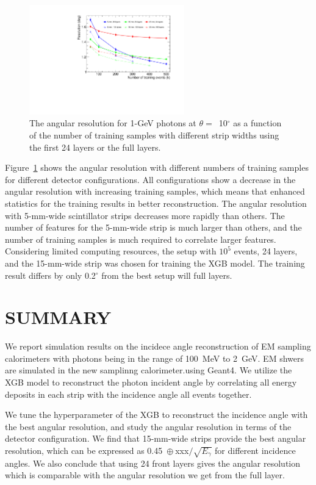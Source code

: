 \documentclass[preprint,12pt,times,a4paper]{elsarticle}
\begin{document}
\begin{figure}[!hbt]
\centering
\includegraphics[width=0.6\textwidth]{figures/Fig8_nsample.pdf}
\caption{ The angular resolution for 1-GeV photons at $\theta=$~10$^{\circ}$ as a function of the number of training samples with different strip widths using the first 24 layers or the full layers. }
\label{fig:multi-parameter}
\end{figure}

Figure~\ref{fig:multi-parameter} shows the angular resolution with different numbers of training samples for different detector configurations. All configurations show a decrease in the angular resolution with increasing training samples, which means that enhanced statistics for the training results in better reconstruction. The angular resolution with 5-mm-wide scintillator strips decreases more rapidly than others. The number of features for the 5-mm-wide strip is much larger than others, and the number of training samples is much required to correlate larger features. Considering limited computing resources, the setup with $10^{5}$ events, 24 layers, and the 15-mm-wide strip was chosen for training the XGB model. The training result differs by only 0.2$^{\circ}$ from the best setup will full layers.
 
\section{SUMMARY}
\label{sec:sum}

We report simulation results on the incidece angle reconstruction of EM sampling calorimeters with photons being in the range of 100~MeV to 2~GeV. EM shwers are simulated in the new samplinng calorimeter.using Geant4. We utilize the XGB model to reconstruct the photon incident angle by correlating all energy deposits in each strip with the incidence angle all events together.

We tune the hyperparameter of the XGB to reconstruct the incidence angle with the best angular resolution, and study the angular resolution in terms of the detector configuration. We find that 15-mm-wide strips provide the best angular resolution, which can be expressed as 0.45~$\oplus~$xxx$/\sqrt{E_\gamma}$ for different incidence angles. We also conclude that using 24 front layers gives the angular resolution which is comparable with the angular resolution we get from the full layer.
\end{document}
